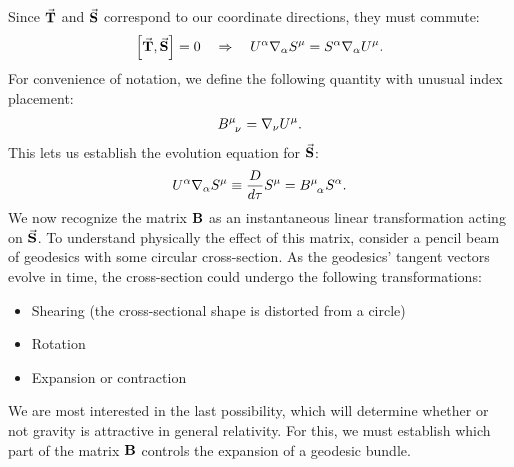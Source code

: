 \documentclass[10pt]{article}
\newcommand{\<}{\langle}
\renewcommand{\>}{\rangle}
\renewcommand{\(}{\left(}
\renewcommand{\)}{\right)}
\renewcommand{\[}{\left[}
\renewcommand{\]}{\right]}
\begin{document}
		Since $\va{T}$ and $\va{S}$ correspond to our coordinate directions, they must commute:
		\begin{align}
			\[ \va{T},\va{S} \] = 0 \quad\Rightarrow\quad U^\alpha \nabla_\alpha S^\mu = S^\alpha \nabla_\alpha U^\mu.
		\end{align}
		For convenience of notation, we define the following quantity with unusual index placement:
		\begin{align}
			\tensor{B}{^\mu_\nu} = \nabla_\nu U^\mu.
		\end{align}
		This lets us establish the evolution equation for $\va{S}$:
		\begin{align}\label{eq:evolutionS}
			U^\alpha \nabla_\alpha S^\mu \equiv \frac{D}{d\tau}S^\mu = \tensor{B}{^\mu_\alpha}S^\alpha.
		\end{align}
		We now recognize the matrix $\vb{B}$ as an instantaneous linear transformation acting on $\va{S}$. To understand physically the effect of this matrix, consider a pencil beam of geodesics with some circular cross-section. As the geodesics' tangent vectors evolve in time, the cross-section could undergo the following transformations:
		\begin{itemize}
			\item Shearing (the cross-sectional shape is distorted from a circle)
			\item Rotation
			\item Expansion or contraction
		\end{itemize}
		We are most interested in the last possibility, which will determine whether or not gravity is attractive in general relativity. For this, we must establish which part of the matrix $\vb{B}$ controls the expansion of a geodesic bundle.
		
\end{document}
